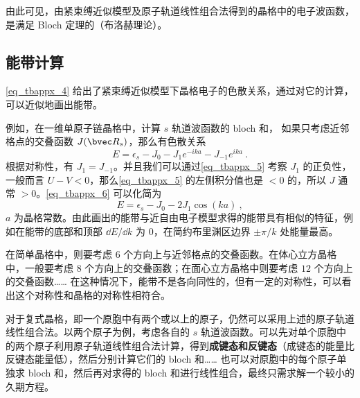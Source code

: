 由此可见，由紧束缚近似模型及原子轨道线性组合法得到的晶格中的电子波函数，是满足 Bloch 定理的（布洛赫理论）。

\subsection{能带计算}
\autoref{eq_tbappx_4} 给出了紧束缚近似模型下晶格电子的色散关系，通过对它的计算，可以近似地画出能带。

例如，在一维单原子链晶格中，计算 $s$ 轨道波函数的 bloch 和， 如果只考虑近邻格点的交叠函数 $J(\bvec R_s)$，那么有色散关系
\begin{equation}\label{eq_tbappx_6}
E=\epsilon_s-J_0-J_1 e^{-i k a}-J_{-1}e^{ika}~.
\end{equation}
根据对称性，有 $J_1=J_{-1}$。并且我们可以通过\autoref{eq_tbappx_5} 考察 $J_1$ 的正负性，一般而言 $U-V<0$，那么\autoref{eq_tbappx_5} 的左侧积分值也是 $<0$ 的，所以 $J$ 通常 $>0$。\autoref{eq_tbappx_6} 可以化简为
\begin{equation}
E=\epsilon_s-J_0-2J_1\cos(ka)~,
\end{equation}
$a$ 为晶格常数。由此画出的能带与近自由电子模型求得的能带具有相似的特征，例如在能带的底部和顶部 $\dd E/\dd k$ 为 $0$，在简约布里渊区边界 $\pm \pi/k$ 处能量最高。

在简单晶格中，则要考虑 $6$ 个方向上与近邻格点的交叠函数。在体心立方晶格中，一般要考虑 $8$ 个方向上的交叠函数；在面心立方晶格中则要考虑 $12$ 个方向上的交叠函数…… 在这种情况下，能带不是各向同性的，但有一定的对称性，可以看出这个对称性和晶格的对称性相符合。

对于复式晶格，即一个原胞中有两个或以上的原子，仍然可以采用上述的原子轨道线性组合法。以两个原子为例，考虑各自的 $s$ 轨道波函数。可以先对单个原胞中的两个原子利用原子轨道线性组合法计算，得到\textbf{成键态和反键态}（成键态的能量比反键态能量低），然后分别计算它们的 bloch 和…… 也可以对原胞中的每个原子单独求 bloch 和，然后再对求得的 bloch 和进行线性组合，最终只需求解一个较小的久期方程。
